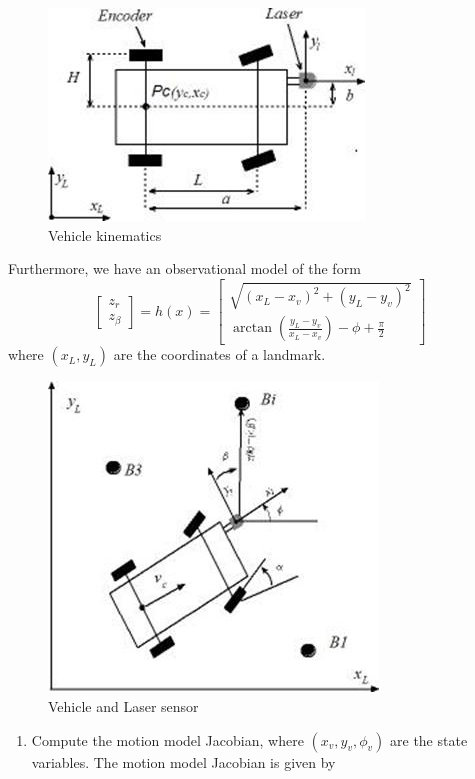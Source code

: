 \documentclass{article}
\begin{document}
\begin{enumerate}
\begin{figure}[H]
    \centering
    \includegraphics[width=0.6\linewidth]{image008.jpg}
    \caption{Vehicle kinematics}
    \label{fig:truck_kinematics_1}
\end{figure}
Furthermore, we have an observational model of the form
\begin{equation}
 \begin{bmatrix}
z_r \\ z_\beta  
\end{bmatrix}   
= h(x) = 
 \begin{bmatrix}
 \sqrt{ (x_L-x_v)^2 + (y_L-y_v)^2 } \\
 \arctan\left(\frac{y_L-y_v}{x_L-x_v}\right) - \phi + \frac{\pi}{2}
 \end{bmatrix} 
\end{equation}
where $(x_L,y_L)$ are the coordinates of a landmark.
\begin{figure}[H]
    \centering
    \includegraphics[width=0.5\linewidth]{image010.jpg}
    \caption{Vehicle and Laser sensor}
    \label{fig:truck_kinematics_2}
\end{figure}
\begin{enumerate}
    \item Compute the motion model Jacobian, where $(x_v,y_v,\phi_v)$ are the state variables.
    The motion model Jacobian is given by

\end{enumerate}
\end{enumerate}
\end{document}
